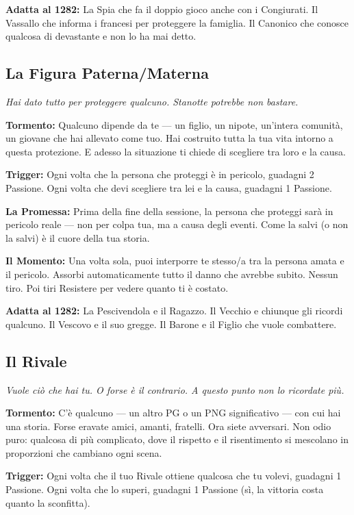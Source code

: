 \textbf{Adatta al 1282:} La Spia che fa il doppio gioco anche con
i Congiurati. Il Vassallo che informa i francesi per proteggere
la famiglia. Il Canonico che conosce qualcosa di devastante e
non lo ha mai detto.

\filetto

\subsection{La Figura Paterna/Materna}
\textit{Hai dato tutto per proteggere qualcuno. Stanotte potrebbe non bastare.}

\textbf{Tormento:} Qualcuno dipende da te — un figlio, un nipote,
un'intera comunità, un giovane che hai allevato come tuo. Hai
costruito tutta la tua vita intorno a questa protezione. E adesso
la situazione ti chiede di scegliere tra loro e la causa.

\textbf{Trigger:} Ogni volta che la persona che proteggi è in
pericolo, guadagni 2 Passione. Ogni volta che devi scegliere tra
lei e la causa, guadagni 1 Passione.

\textbf{La Promessa:} Prima della fine della sessione, la persona
che proteggi sarà in pericolo reale — non per colpa tua, ma a causa
degli eventi. Come la salvi (o non la salvi) è il cuore della
tua storia.

\textbf{Il Momento:} Una volta sola, puoi interporre te stesso/a
tra la persona amata e il pericolo. Assorbi automaticamente tutto
il danno che avrebbe subito. Nessun tiro. Poi tiri Resistere per
vedere quanto ti è costato.

\textbf{Adatta al 1282:} La Pescivendola e il Ragazzo. Il Vecchio
e chiunque gli ricordi qualcuno. Il Vescovo e il suo gregge. Il Barone
e il Figlio che vuole combattere.

\filetto

\subsection{Il Rivale}
\textit{Vuole ciò che hai tu. O forse è il contrario. A questo punto non lo ricordate più.}

\textbf{Tormento:} C'è qualcuno — un altro PG o un PNG significativo
— con cui hai una storia. Forse eravate amici, amanti, fratelli.
Ora siete avversari. Non odio puro: qualcosa di più complicato,
dove il rispetto e il risentimento si mescolano in proporzioni
che cambiano ogni scena.

\textbf{Trigger:} Ogni volta che il tuo Rivale ottiene qualcosa che
tu volevi, guadagni 1 Passione. Ogni volta che lo superi, guadagni
1 Passione (sì, la vittoria costa quanto la sconfitta).

